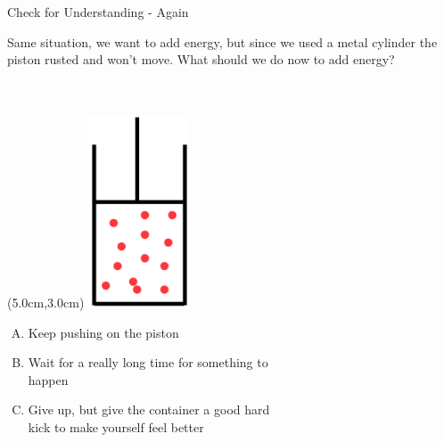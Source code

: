 \documentclass{beamer}
\newcommand{\red}[1]{{\color{red}{#1}}}
\newcommand{\checkl}[2]{\begin{textblock*}{1cm}(#1,#2){\large \red{\Checkmark}}\end{textblock*}}
\begin{document}
\begin{frame}[t]{Check for Understanding - Again}
\begin{center}
   Same situation, we want to add energy, but since we used a metal cylinder the piston rusted and won't move. What should we do now to add energy? ~\\~\\~\\
   \begin{textblock*}{\textwidth}(5.0cm,3.0cm) %
      \includegraphics[width=3.0cm]{figures/mypiston.png}
   \end{textblock*}
   \begin{enumerate}[A.]
      \item Keep pushing on the piston
      \item Wait for a really long time for something to \\ happen
      \item Give up, but give the container a good hard \\ kick to make yourself feel better
   \end{enumerate}
\only<2>{\checkl{0.5cm}{4.8cm}}
\end{center}
\end{frame}
\end{document}
